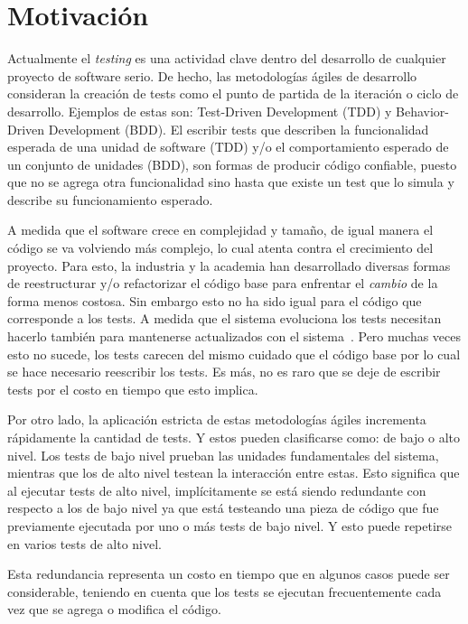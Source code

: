\section{Motivación}
\par Actualmente el \emph{testing} es una actividad clave dentro del desarrollo de cualquier proyecto de software serio. De hecho, las metodologías ágiles de desarrollo consideran la creación de tests como el punto de partida de la iteración o ciclo de desarrollo. Ejemplos de estas son: Test-Driven Development (TDD) y Behavior-Driven Development (BDD). El escribir tests que describen la funcionalidad esperada de una unidad de software (TDD) y/o el comportamiento esperado de un conjunto de unidades (BDD), son formas de producir código confiable, puesto que no se agrega otra funcionalidad sino hasta que existe un test que lo simula y describe su funcionamiento esperado.

\par A medida que el software crece en complejidad y tamaño, de igual manera el código se va volviendo más complejo, lo cual atenta contra el crecimiento del proyecto. Para esto, la industria y la academia han desarrollado diversas formas de reestructurar y/o refactorizar el código base para enfrentar el \emph{cambio} de la forma menos costosa. Sin embargo esto no ha sido igual para el código que corresponde a los tests. A medida que el sistema evoluciona los tests necesitan hacerlo también para mantenerse actualizados con el sistema~\cite{reichhart2007rule}.  Pero muchas veces esto no sucede, los tests carecen del mismo cuidado que el código base por lo cual se hace necesario reescribir los tests. Es más, no es raro que se deje de escribir tests por el costo en tiempo que esto implica.

\par Por otro lado, la aplicación estricta de estas metodologías ágiles incrementa rápidamente la cantidad de tests. Y estos pueden clasificarse como: de bajo o alto nivel. Los  tests de bajo nivel prueban las unidades fundamentales del sistema,  mientras que los de alto nivel testean la interacción entre estas. Esto significa que al ejecutar tests de alto nivel, implícitamente se está siendo redundante con respecto a los de bajo nivel ya que está testeando una pieza de código que fue previamente ejecutada por uno o más tests de bajo nivel. Y esto puede repetirse en varios tests de alto nivel.

\par Esta redundancia representa un costo en tiempo que en algunos casos puede ser considerable, teniendo en cuenta que los tests se ejecutan frecuentemente cada vez que se agrega o modifica el código. 


